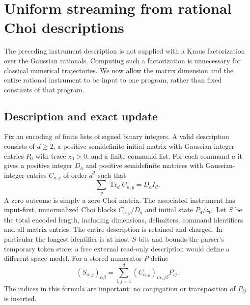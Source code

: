 \section{Uniform streaming from rational Choi descriptions}\label{sec:uniformchoi66}
The preceding instrument description is not supplied with a Kraus
factorization over the Gaussian rationals. Computing such a
factorization is unnecessary for classical numerical trajectories. We now allow the
matrix dimension and the entire rational instrument to be input to one
program, rather than fixed constants of that program.

\subsection{Description and exact update}
Fix an encoding of finite lists of signed binary integers. A valid
description consists of $d\ge2$, a positive semidefinite initial matrix with Gaussian-integer entries $P_0$ with trace $z_0>0$, and a finite command list. For each
command $a$ it gives a positive integer $D_a$ and positive semidefinite matrices with Gaussian-integer entries $C_{a,y}$ of order $d^2$ such that
\begin{equation}\label{eq:rationalchoi66}
           \sum_y\operatorname{Tr}_d C_{a,y}=D_a I_d.
\end{equation}
A zero outcome is simply a zero Choi matrix. The associated instrument
has input-first, unnormalized Choi blocks $C_{a,y}/D_a$ and initial state $P_0/z_0$.
Let $S$ be the total encoded length, including dimensions, delimiters,
command identifiers and all matrix entries. The entire description is
retained and charged. In particular the longest identifier is at most
$S$ bits and bounds the parser's temporary token store; a free external
read-only description would define a different space model. For a stored numerator $P$ define
\begin{equation}\label{eq:choiaction66}
 (S_{a,y})_{\alpha\beta}
       =\sum_{i,j=1}^d(C_{a,y})_{i\alpha,j\beta}P_{ij}.
\end{equation}
The indices in this formula are important: no conjugation or
transposition of $P_{ij}$ is inserted.

